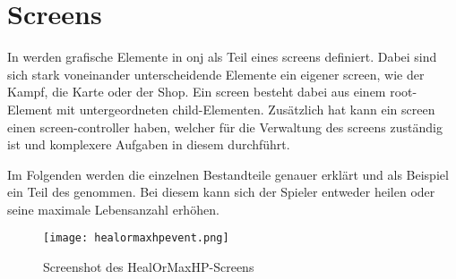 \renewcommand{\kapitelautor}{Autor: Felix Zwickelstorfer}
\section{Screens}\label{sec:screens}
\renewcommand{\kapitelautor}{Autor: Felix Zwickelstorfer}
In \FF werden grafische Elemente in onj als Teil eines screens definiert.
Dabei sind sich stark voneinander unterscheidende Elemente ein eigener screen, wie \zB der Kampf, die Karte oder der Shop.
Ein screen besteht dabei aus einem root-Element mit untergeordneten child-Elementen.
Zusätzlich hat kann ein screen einen screen-controller haben, welcher für die Verwaltung des screens zuständig ist und komplexere Aufgaben in diesem durchführt.

Im Folgenden werden die einzelnen Bestandteile genauer erklärt und als Beispiel ein Teil des   genommen.
Bei diesem kann sich der Spieler entweder heilen oder seine maximale Lebensanzahl erhöhen.
\begin{figure}[H]
    \centering
    \texttt{[image: healormaxhpevent.png]}
    \caption{Screenshot des HealOrMaxHP-Screens}
\end{figure}




